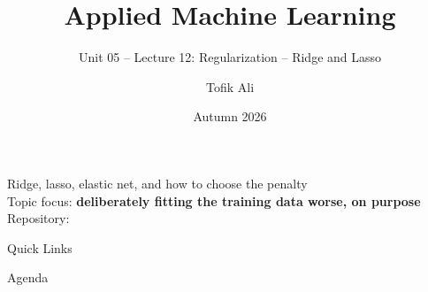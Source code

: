 \documentclass[aspectratio=169]{beamer}
\title[Applied Machine Learning]{Applied Machine Learning}
\subtitle{Unit 05 -- Lecture 12: Regularization -- Ridge and Lasso}
\author{Tofik Ali}
\institute{School of Computer Science, UPES Dehradun}
\date{Autumn 2026}
\begin{document}
\UPESCoverFrame
\setcounter{framenumber}{0}

\begin{frame}
  \titlepage
  \begin{center}
    \footnotesize Ridge, lasso, elastic net, and how to choose the penalty\\[0.25em]
    \footnotesize Topic focus: \textbf{deliberately fitting the training data
    worse, on purpose}\\[0.25em]
    \footnotesize Repository: \texttt{\AMLRepoURL}
  \end{center}
  \slidesources{\AMLUnitVSources}
\end{frame}

\begin{frame}{Quick Links}
  \centering
  \hyperlink{sec:why}{}\hspace{0.35em}
  \hyperlink{sec:ridge}{}\hspace{0.35em}
  \hyperlink{sec:lasso}{}\hspace{0.35em}
  \hyperlink{sec:paths}{}\hspace{0.35em}
  \hyperlink{sec:scale}{}\hspace{0.35em}
  \hyperlink{sec:cv}{}\hspace{0.35em}
  \hyperlink{sec:bv}{}\hspace{0.35em}
  \hyperlink{sec:enet}{}\hspace{0.35em}
  \hyperlink{sec:summary}{}
\end{frame}

\begin{frame}{Agenda}
  \tableofcontents
\end{frame}
\end{document}
